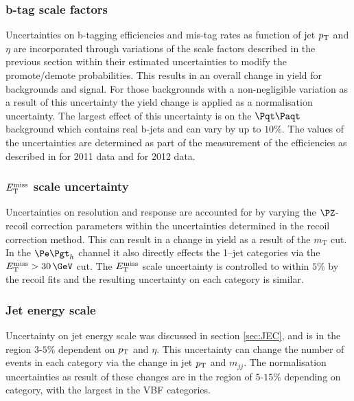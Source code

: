 \subsubsection{\textbf{b-tag scale factors}} 
Uncertainties on b-tagging efficiencies and mis-tag rates as function of jet
$p_{\mathrm{T}}$ and $\eta$ are incorporated through variations of the scale factors
described in the previous section within their estimated uncertainties to modify
the promote/demote probabilities. This results in an overall change in yield for
backgrounds and signal. For those backgrounds
with a non-negligible variation as a result of this uncertainty the yield change
is applied as a normalisation uncertainty. The largest effect of this
uncertainty is on the $\ttbar$ background which contains real b-jets and can
vary by up to $10\%$. The values of the uncertainties 
are determined as part of the measurement of the efficiencies as described in 
\cite{CMS-PAS-BTV-11-004} for 2011 data and \cite{CMS-PAS-BTV-13-001} for 2012 data.

\subsubsection{\textbf{$E_{\mathrm{T}}^{\text{miss}}$ scale uncertainty}}
Uncertainties on \MET resolution and response are accounted for
by varying the $\PZ$-recoil correction parameters within the uncertainties
determined in the recoil correction method.
This can result in a change in yield as a result of the $m_{\text{T}}$ cut. 
In the $\etau$ channel it also directly
effects the 1--jet categories via the $\MET > 30\,\GeV$ cut. The $E_{\mathrm{T}}^{\text{miss}}$ scale
uncertainty is controlled to within $5\%$ \cite{CMS-PAS-JME-12-002} by the 
recoil fits and the resulting uncertainty on each category is similar. 

\subsubsection{\textbf{Jet energy scale}}
Uncertainty on jet energy scale was discussed in section
\ref{sec:JEC}, and is in the region $3$-$5\%$ dependent on $p_{\mathrm{T}}$ and $\eta$.
This uncertainty can change the number of events in
each category via the change in jet $p_{\mathrm{T}}$ and $m_{jj}$. The normalisation
uncertainties as result of these changes are in the region of $5$-$15\%$
depending on category, with the largest in the VBF categories. 

